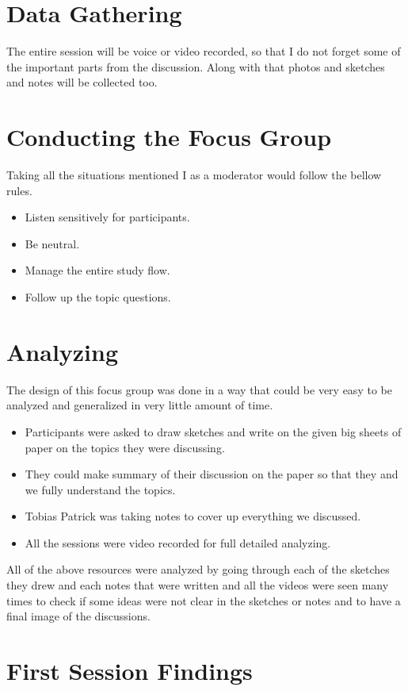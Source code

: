 \section{Data Gathering}
The entire session will be voice or video recorded, so that I do not forget some of the important parts from the discussion. Along with that photos and sketches and notes will be collected too.

\section{Conducting the Focus Group}
Taking all the situations mentioned I as a moderator would follow the bellow rules.
\begin {itemize}
\item Listen sensitively for participants. 
\item	Be neutral. 
\item	Manage the entire study flow. 
\item	Follow up the topic questions. 
\end{itemize}


\section{Analyzing}
The design of this focus group was done in a way that could be very easy to be analyzed and generalized in very little amount of time. 

\begin {itemize}
\item	Participants were asked to draw sketches and write on the given big sheets of paper on the topics they were discussing.
\item	They could make summary of their discussion on the paper so that they and we fully understand the topics.
\item	Tobias Patrick was taking notes to cover up everything we discussed.
\item	All the sessions were video recorded for full detailed analyzing. 
\end{itemize}

All of the above resources were analyzed by going through each of the sketches they drew and each notes that were written and all the videos were seen many times to check if some ideas were not clear in the sketches or notes and to have a final image of the discussions.

\section {First Session Findings}

